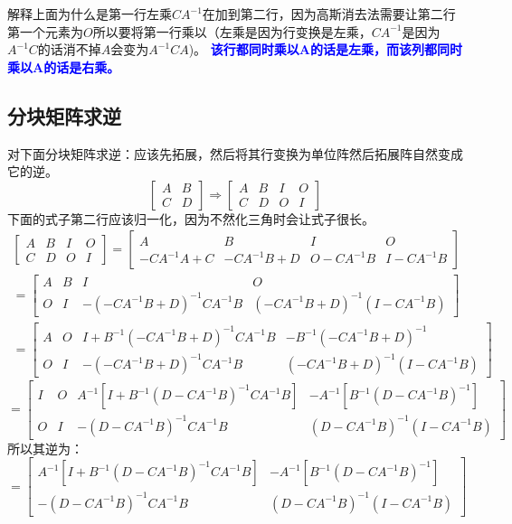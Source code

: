 \documentclass[12pt]{article}
\begin{document}
\begin{CJK*}{UTF8}{gbsn}
解释上面为什么是第一行左乘$CA^{-1}$在加到第二行，因为高斯消去法需要让第二行第一个元素为$O$所以要将第一行乘以（左乘是因为行变换是左乘，$CA^{-1}$是因为$A^{-1}C$的话消不掉$A$会变为$A^{-1}CA$)。
\textbf{\textcolor{blue}{该行都同时乘以A的话是左乘，而该列都同时乘以A的话是右乘。}}
\subsection{分块矩阵求逆}
对下面分块矩阵求逆：应该先拓展，然后将其行变换为单位阵然后拓展阵自然变成它的逆。
\begin{equation*}
\begin{bmatrix}
	A& B \\
	C& D 
\end{bmatrix}\Rightarrow 
\begin{bmatrix}
	A& B &I&O\\
	C& D &O&I
\end{bmatrix}
\end{equation*}
下面的式子第二行应该归一化，因为不然化三角时会让式子很长。
\begin{align*}
	\begin{bmatrix}
	A& B &I&O\\
	C& D &O&I
\end{bmatrix}=\begin{bmatrix}
	A& B& I&O\\
	-CA^{-1}A+C& -CA^{-1}B+D& O-CA^{-1}B&I-CA^{-1}B
\end{bmatrix}\\
=\begin{bmatrix}
	A& B & I &O\\
	O& I& -(-CA^{-1}B+D)^{-1}CA^{-1}B& (-CA^{-1}B+D)^{-1}(I-CA^{-1}B)
\end{bmatrix}\\
=\begin{bmatrix}
	A& O & I+B^{-1}(-CA^{-1}B+D)^{-1}CA^{-1}B &-B^{-1}(-CA^{-1}B+D)^{-1}\\
	O& I& -(-CA^{-1}B+D)^{-1}CA^{-1}B& (-CA^{-1}B+D)^{-1}(I-CA^{-1}B)
\end{bmatrix}
\end{align*}
\begin{equation*}
	=\begin{bmatrix}
	I& O & A^{-1}[I+B^{-1}(D-CA^{-1}B)^{-1}CA^{-1}B] &-A^{-1}[B^{-1}(D-CA^{-1}B)^{-1}]\\
	O& I& -(D-CA^{-1}B)^{-1}CA^{-1}B& (D-CA^{-1}B)^{-1}(I-CA^{-1}B)
\end{bmatrix}
\end{equation*}
所以其逆为：
\begin{equation*}
	=\begin{bmatrix}
	 A^{-1}[I+B^{-1}(D-CA^{-1}B)^{-1}CA^{-1}B] &-A^{-1}[B^{-1}(D-CA^{-1}B)^{-1}]\\
	-(D-CA^{-1}B)^{-1}CA^{-1}B& (D-CA^{-1}B)^{-1}(I-CA^{-1}B)
\end{bmatrix}
\end{equation*}


\end{CJK*}
\end{document}
